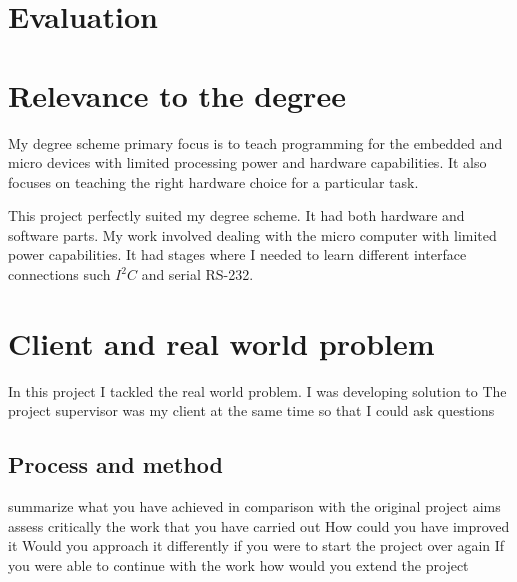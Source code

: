 \chapter{Evaluation}
\chapter{Relevance to the degree}
My degree scheme primary focus is to teach programming for the embedded and micro devices with limited processing power and hardware capabilities. It also focuses on teaching the right hardware choice for a particular task.

This project perfectly suited my degree scheme. It had both hardware and software parts. My work involved dealing with the micro computer with limited power capabilities. It had stages where I needed to learn different interface connections such $I^2C$ and serial RS-232.    

\chapter{Client and real world problem}
In this project I tackled the real world problem. I was developing solution to  The project supervisor was my client at the same time so that I could ask questions  



\section{Process and method}

summarize what you have achieved in comparison with the original project aims 
assess critically the work that you have carried out
How could you have improved it
Would you approach it differently if you were to start the project over again
If you were able to continue with the work how would you extend the project
